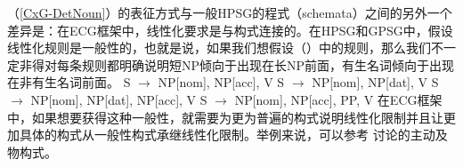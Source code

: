 （\ref{CxG-DetNoun}）的表征方式与一般HPSG的程式（schemata）之间的另外一个差异是：在ECG框架中，线性化要求是与构式连接的。在HPSG\indexhpsgc 和GPSG\indexgpsgc 中，假设线性化规则是一般性的，也就是说，如果我们想假设（）中的规则，那么我们不一定非得对每条规则都明确说明短NP倾向于出现在长NP前面，有生名词倾向于出现在非有生名词前面。
\eal
\ex S $\to$ NP[nom], NP[acc], V
\ex S $\to$ NP[nom], NP[dat], V
\ex S $\to$ NP[nom], NP[dat], NP[acc], V
\ex S $\to$ NP[nom], NP[acc], PP, V
\zl
在ECG框架中，如果想要获得这种一般性，就需要为更为普遍的构式说明线性化限制并且让更加具体的构式从一般性构式承继线性化限制。举例来说，可以参考 \citet[]{BC2005a}讨论的主动及物构式。

